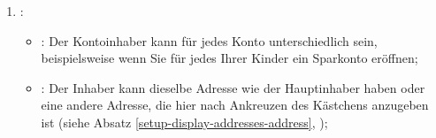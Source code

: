 \begin{enumerate}
\begin{itemize}
		\item {}: Weitere Einzelheiten finden Sie im Abschnitt \vref{accounts-type};
		\item {}: die Währung, in der die Buchungen für dieses Konto abgewickelt werden (siehe Abschnitte \vref{setup-resources-currencies} und \vref{setup-resources-rate});
		\item {}: Kontrollkästchen, mit dem Sie das Konto im Navigationsbereich und in der Informationsleiste ausblenden können, ohne es zu löschen; es kann durch Klicken auf das Menü  wieder eingeblendet werden;
	\end{itemize}
	\item {}:
	\begin{itemize}
		\item {}: Der Kontoinhaber kann für jedes Konto unterschiedlich sein, beispielsweise wenn Sie für jedes Ihrer Kinder ein Sparkonto eröffnen;
		\item {}: Der Inhaber kann dieselbe Adresse wie der Hauptinhaber haben oder eine andere Adresse, die hier nach Ankreuzen des Kästchens  anzugeben ist (siehe Absatz \vref{setup-display-addresses-address}, );

\end{itemize}
\end{enumerate}
